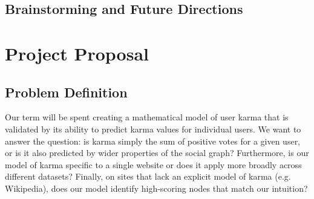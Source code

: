 \documentclass[11pt]{article}
\begin{document}

\subsection{Brainstorming and Future Directions}

\section{Project Proposal}
\subsection{Problem Definition}
Our term will be spent creating a mathematical model of user karma that is
validated by its ability to predict karma values for individual users. We want to answer the 
question: is karma simply the sum of positive votes for a given user, or is it also 
predicted by wider properties of the social graph? Furthermore, is our model of karma
specific to a single website or does it apply more broadly across different datasets?
Finally, on sites that lack an explicit model of karma (e.g. Wikipedia), does our model
identify high-scoring nodes that match our intuition?
\end{document}
